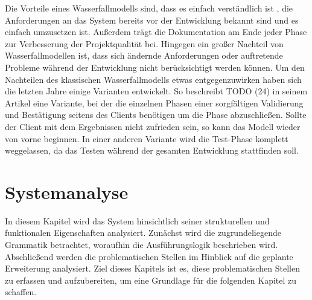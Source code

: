 \documentclass{article}
\begin{document}
    Die Vorteile eines Wasserfallmodells sind, dass es einfach verständlich ist \cite{22}, die Anforderungen an das System bereits vor der Entwicklung bekannt sind und es einfach umzusetzen ist. \cite{23} 
    Außerdem trägt die Dokumentation am Ende jeder Phase zur Verbesserung der Projektqualität bei. \cite{23}
    Hingegen ein großer Nachteil von Wasserfallmodellen ist, dass sich ändernde Anforderungen oder auftretende Probleme während der Entwicklung nicht berücksichtigt werden können. \cite{23} 
    Um den Nachteilen des klassischen Wasserfallmodells etwas entgegenzuwirken haben sich die letzten Jahre einige Varianten entwickelt.
    So beschreibt TODO (24) in seinem Artikel eine Variante, bei der die einzelnen Phasen einer sorgfältigen Validierung und Bestätigung seitens des Clients benötigen um die Phase abzuschließen. 
    Sollte der Client mit dem Ergebnissen nicht zufrieden sein, so kann das Modell wieder von vorne beginnen. \cite{24} 
    In einer anderen Variante wird die Test-Phase komplett weggelassen, da das Testen während der gesamten Entwicklung stattfinden soll. \cite{25}
    \newpage
    \section{Systemanalyse}
    In diesem Kapitel wird das System hinsichtlich seiner strukturellen und funktionalen Eigenschaften analysiert. 
    Zunächst wird die zugrundeliegende Grammatik betrachtet, woraufhin die Ausführungslogik beschrieben wird. Abschließend werden die problematischen Stellen im Hinblick auf die geplante Erweiterung analysiert.
    Ziel dieses Kapitels ist es, diese problematischen Stellen zu erfassen und aufzubereiten, um eine Grundlage für die folgenden Kapitel zu schaffen.\\
\end{document}
